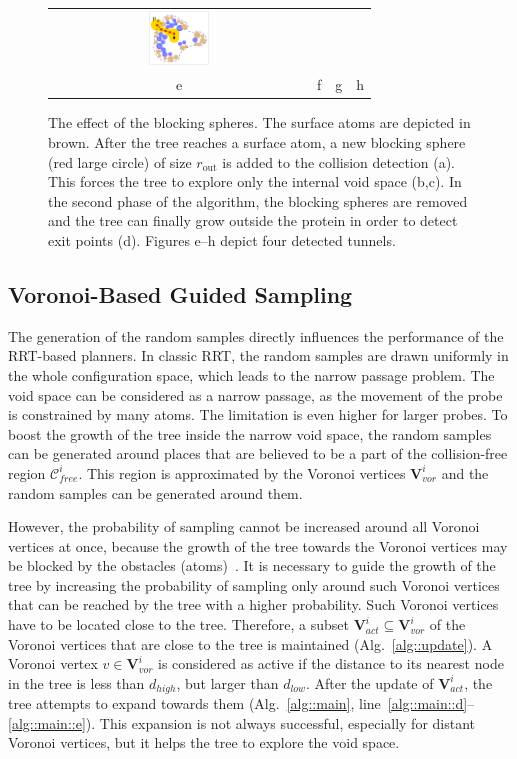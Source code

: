 \documentclass[usletter, 10pt, conference]{svjour3}      %
\def\CF{\mathcal{C}_{free}}
\def\VV{\mathbf{V}_{vor}}
\def\VVA{\mathbf{V}_{act}}
\def\da{d_{high}}
\def\db{d_{low}}
\def\gprobe{r_{\mathrm{out}}}
\begin{document}
\begin{figure}
{\begin{tabular}{cccc}
\includegraphics[width=0.24\textwidth]{fig/blockingb10d} \\
e & f & g & h \\
\end{tabular}
}
\caption{\label{fig::blocking2}
The effect of the blocking spheres. 
The surface atoms are depicted in brown.
After the tree reaches a surface atom, a new blocking sphere (red large circle) of size $\gprobe$ is added to the collision detection (a).
This forces the tree to explore only the internal void space (b,c).
In the second phase of the algorithm, the blocking spheres are removed and the tree can finally grow outside the protein in order
to detect exit points (d).
Figures e--h depict four detected tunnels.
}
\end{figure}


\subsection{Voronoi-Based Guided Sampling}
\label{sec::vbg}

The generation of the random samples directly influences the performance of the RRT-based planners.
In classic RRT, the random samples are drawn uniformly in the whole configuration space, which leads to the narrow passage problem.
The void space can be considered as a narrow passage, as the movement of the probe is constrained by many atoms.
The limitation is even higher for larger probes.
To boost the growth of the tree inside the narrow void space, the random samples can be generated around places that are believed to be a part of the collision-free region $\CF^i$.
This region is approximated by the Voronoi vertices $\VV^i$ and the random samples can be generated around them.

However, the probability of sampling cannot be increased around all Voronoi vertices at once, because the growth of the tree towards the Voronoi vertices may be blocked by the obstacles (atoms)~\cite{vonasekphd}.
It is necessary to guide the growth of the tree by increasing the probability of sampling only around such Voronoi vertices that can be reached by the tree with a higher probability.
Such Voronoi vertices have to be located close to the tree.
Therefore, a subset $\VVA^i \subseteq \VV^i$ of the Voronoi vertices that are close to the tree is maintained (Alg.~\ref{alg::update}).
A Voronoi vertex $v \in \VV^i$ is considered as active if the distance to its nearest node in the tree is less than $\da$, but larger than $\db$.
After the update of $\VVA^i$, the tree attempts to expand towards them (Alg.~\ref{alg::main}, line~\ref{alg::main::d}--\ref{alg::main::e}).
This expansion is not always successful, especially for distant Voronoi vertices, but it helps the tree to explore the void space.
\end{document}
